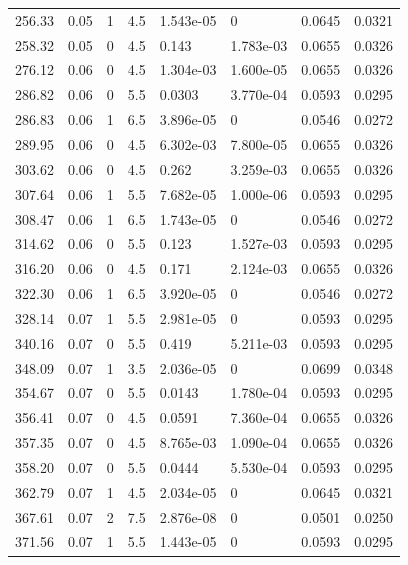 \documentclass[preview]{standalone}
\begin{document}
{{{\begin{tabular}{L{1.2cm}C{1.2cm} C{0.3cm}C{0.5cm} C{1.4cm}C{1.4cm} C{1.4cm}C{1.4cm}}
  256.33  &  0.05  & 1     & 4.5 &  1.543e-05  & 0  & 0.0645 &  0.0321   \\ 
  258.32  &  0.05  & 0     & 4.5 &  0.143  & 1.783e-03  & 0.0655 &  0.0326   \\ 
  276.12  &  0.06  & 0     & 4.5 &  1.304e-03  & 1.600e-05  & 0.0655 &  0.0326   \\ 
  286.82  &  0.06  & 0     & 5.5 &  0.0303  & 3.770e-04  & 0.0593 &  0.0295   \\ 
  286.83  &  0.06  & 1     & 6.5 &  3.896e-05  & 0  & 0.0546 &  0.0272   \\ 
  289.95  &  0.06  & 0     & 4.5 &  6.302e-03  & 7.800e-05  & 0.0655 &  0.0326   \\ 
  303.62  &  0.06  & 0     & 4.5 &  0.262  & 3.259e-03  & 0.0655 &  0.0326   \\ 
  307.64  &  0.06  & 1     & 5.5 &  7.682e-05  & 1.000e-06  & 0.0593 &  0.0295   \\ 
  308.47  &  0.06  & 1     & 6.5 &  1.743e-05  & 0  & 0.0546 &  0.0272   \\ 
  314.62  &  0.06  & 0     & 5.5 &  0.123  & 1.527e-03  & 0.0593 &  0.0295   \\ 
  316.20  &  0.06  & 0     & 4.5 &  0.171  & 2.124e-03  & 0.0655 &  0.0326   \\ 
  322.30  &  0.06  & 1     & 6.5 &  3.920e-05  & 0  & 0.0546 &  0.0272   \\ 
  328.14  &  0.07  & 1     & 5.5 &  2.981e-05  & 0  & 0.0593 &  0.0295   \\ 
  340.16  &  0.07  & 0     & 5.5 &  0.419  & 5.211e-03  & 0.0593 &  0.0295   \\ 
  348.09  &  0.07  & 1     & 3.5 &  2.036e-05  & 0  & 0.0699 &  0.0348   \\ 
  354.67  &  0.07  & 0     & 5.5 &  0.0143  & 1.780e-04  & 0.0593 &  0.0295   \\ 
  356.41  &  0.07  & 0     & 4.5 &  0.0591  & 7.360e-04  & 0.0655 &  0.0326   \\ 
  357.35  &  0.07  & 0     & 4.5 &  8.765e-03  & 1.090e-04  & 0.0655 &  0.0326   \\ 
  358.20  &  0.07  & 0     & 5.5 &  0.0444  & 5.530e-04  & 0.0593 &  0.0295   \\ 
  362.79  &  0.07  & 1     & 4.5 &  2.034e-05  & 0  & 0.0645 &  0.0321   \\ 
  367.61  &  0.07  & 2     & 7.5 &  2.876e-08  & 0  & 0.0501 &  0.0250   \\ 
  371.56  &  0.07  & 1     & 5.5 &  1.443e-05  & 0  & 0.0593 &  0.0295   \\ 

\end{tabular}}}}
\end{document}

